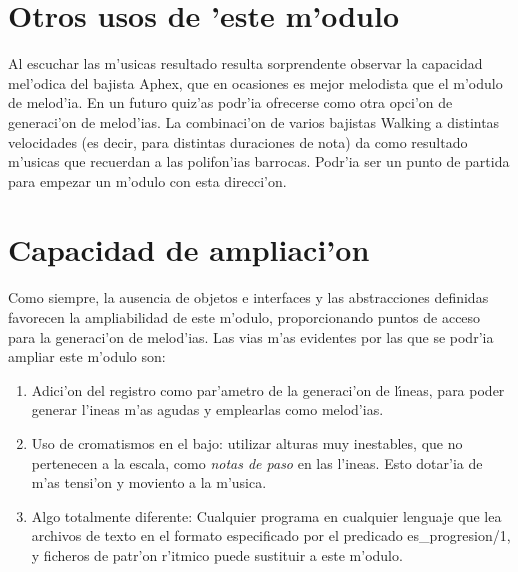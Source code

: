 \section {Otros usos de 'este m'odulo}
Al escuchar las m'usicas resultado resulta sorprendente observar la capacidad mel'odica del bajista Aphex, que en ocasiones es mejor melodista que el m'odulo de melod'ia. En un futuro quiz'as podr'ia ofrecerse como otra opci'on de generaci'on de melod'ias.
\newline
La combinaci'on de varios bajistas Walking a distintas velocidades (es decir, para distintas duraciones de nota) da como resultado m'usicas que recuerdan a las polifon'ias barrocas. Podr'ia ser un punto de partida para empezar un m'odulo con esta direcci'on.


\section {Capacidad de ampliaci'on}
Como siempre, la ausencia de objetos e interfaces y las abstracciones definidas favorecen la ampliabilidad de este m'odulo, proporcionando puntos de acceso para la generaci'on de melod'ias. Las vias m'as evidentes por las que se podr'ia ampliar este m'odulo son:
\begin{enumerate}
	\item Adici'on del registro como par'ametro de la generaci'on de l\'\i neas, para poder generar l'ineas m'as agudas y emplearlas como melod'ias.
	\item Uso de cromatismos en el bajo: utilizar alturas muy inestables, que no pertenecen a la escala, como \emph{notas de paso} en las l'ineas. Esto dotar'ia de m'as tensi'on y moviento a la m'usica.
	\item Algo totalmente diferente: Cualquier programa en cualquier lenguaje que lea archivos de texto en el formato especificado por el predicado es\_progresion/1, y ficheros de patr'on r'itmico puede sustituir a este m'odulo.
	\end{enumerate}

